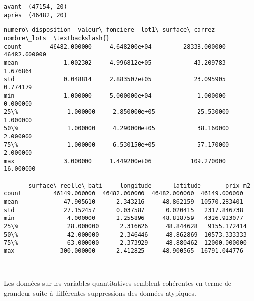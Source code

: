 \documentclass[11pt]{article}
\makeatletter
\newcommand{\boxspacing}{\kern\kvtcb@left@rule\kern\kvtcb@boxsep}
\newcommand{\prompt}[4]{
        {\ttfamily\llap{{\color{#2}[#3]:\hspace{3pt}#4}}\vspace{-\baselineskip}}
    }
\makeatother
\begin{document}
    \begin{Verbatim}[commandchars=\\\{\}]
avant  (47154, 20)
après  (46482, 20)
    \end{Verbatim}

            \begin{tcolorbox}[breakable, size=fbox, boxrule=.5pt, pad at break*=1mm, opacityfill=0]
\prompt{Out}{outcolor}{40}{\boxspacing}
\begin{Verbatim}[commandchars=\\\{\}]
       numero\_disposition  valeur\_fonciere  lot1\_surface\_carrez   nombre\_lots  \textbackslash{}
count        46482.000000     4.648200e+04         28338.000000  46482.000000
mean             1.002302     4.996812e+05            43.209783      1.676864
std              0.048814     2.883507e+05            23.095905      0.774179
min              1.000000     5.000000e+04             1.000000      0.000000
25\%              1.000000     2.850000e+05            25.530000      1.000000
50\%              1.000000     4.290000e+05            38.160000      2.000000
75\%              1.000000     6.530150e+05            57.170000      2.000000
max              3.000000     1.449200e+06           109.270000     16.000000

       surface\_reelle\_bati     longitude      latitude       prix m2
count         46149.000000  46482.000000  46482.000000  46149.000000
mean             47.905610      2.343216     48.862159  10570.283401
std              27.152457      0.037587      0.020415   2317.846738
min               4.000000      2.255896     48.818759   4326.923077
25\%              28.000000      2.316626     48.844628   9155.172414
50\%              42.000000      2.346446     48.862869  10573.333333
75\%              63.000000      2.373929     48.880462  12000.000000
max             300.000000      2.412825     48.900565  16791.044776
\end{Verbatim}
\end{tcolorbox}
        
    \begin{center}
    \end{center}
    { \hspace*{\fill} \\}
    
    Les données sur les variables quantitatives semblent cohérentes en terme
de grandeur suite à différentes suppressions des données atypiques.
\end{document}
